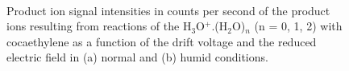\begin{figure}[htbp]
\centering
{}\\
\caption{Product ion signal intensities in counts per second of the product ions resulting from reactions of the H$_3$O$^+$.(H$_2$O)$_n$ (n = 0, 1, 2) with cocaethylene as a function of the drift voltage and the reduced electric field in (a) normal and (b) humid conditions.}
\label{fig:cocaetEN}
\end{figure}











